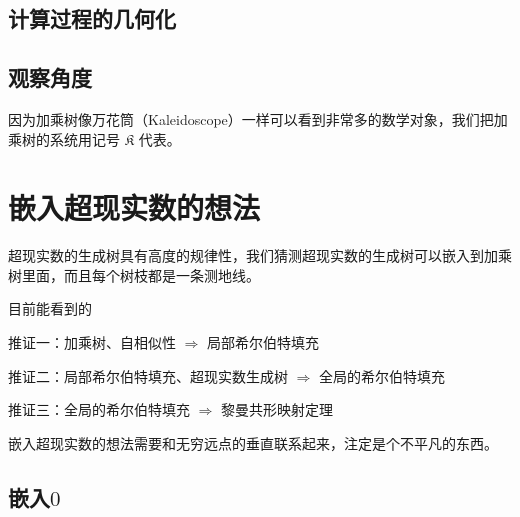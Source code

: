 \documentclass[a4paper,12pt]{article}
\begin{document}
\subsection{计算过程的几何化}


\subsection{观察角度}

因为加乘树像万花筒（Kaleidoscope）一样可以看到非常多的数学对象，我们把加乘树的系统用记号 $\mathfrak{K}$ 代表。

\newpage

\section{嵌入超现实数的想法}

超现实数的生成树具有高度的规律性，我们猜测超现实数的生成树可以嵌入到加乘树里面，而且每个树枝都是一条测地线。

目前能看到的

推证一：加乘树、自相似性 $\Rightarrow$ 局部希尔伯特填充

推证二：局部希尔伯特填充、超现实数生成树 $\Rightarrow$ 全局的希尔伯特填充

推证三：全局的希尔伯特填充 $\Rightarrow$ 黎曼共形映射定理

嵌入超现实数的想法需要和无穷远点的垂直联系起来，注定是个不平凡的东西。

\subsection{嵌入$0$}
\end{document}
